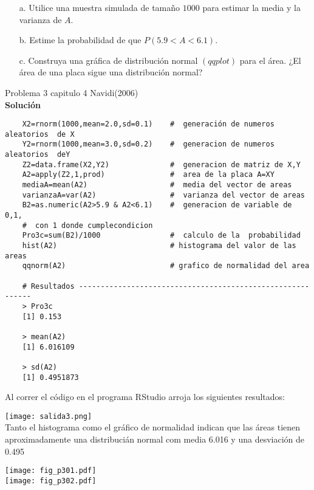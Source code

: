 \documentclass[base=hide,12pt]{elegantbook}
\begin{document}
\begin{itemize}
	\item[a.] Utilice una muestra simulada de tamaño $1000$ para estimar la media y la varianza de $A$.
	\item[b.] Estime la probabilidad de que $P(5.9 <A<6.1)$.
	\item[c.] Construya una gráfica de distribución normal $(qqplot)$ para el área. ¿El área de una placa sigue una distribución normal? 
\end{itemize}
Problema 3 capitulo 4 Navidi(2006) \\

\newpage 
\textcolor{col3}{\bf \large Solución}\\

\begin{lstlisting}
	X2=rnorm(1000,mean=2.0,sd=0.1)    #  generación de numeros aleatorios  de X
	Y2=rnorm(1000,mean=3.0,sd=0.2)    #  generacion de numeros aleatorios  deY
	Z2=data.frame(X2,Y2)              #  generacion de matriz de X,Y
	A2=apply(Z2,1,prod)               #  area de la placa A=XY
	mediaA=mean(A2)                   #  media del vector de areas 
	varianzaA=var(A2)                 #  varianza del vector de areas 
	B2=as.numeric(A2>5.9 & A2<6.1)    #  generacion de variable de 0,1, 
	#  con 1 donde cumplecondicion   
	Pro3c=sum(B2)/1000                #  calculo de la  probabilidad 
	hist(A2)                          # histograma del valor de las areas
	qqnorm(A2)                        # grafico de normalidad del area
	
	# Resultados -----------------------------------------------------------
	> Pro3c
	[1] 0.153
	
	> mean(A2)
	[1] 6.016109
	
	> sd(A2)
	[1] 0.4951873
\end{lstlisting}

Al correr el código en el programa   RStudio arroja los siguientes  resultados:

\texttt{[image: salida3.png]}\\

Tanto el histograma como el gráfico de normalidad indican que las áreas tienen aproximadamente una distribucián normal com media 6.016 y una desviación de 0.495

\texttt{[image: fig\_p301.pdf]}\\

\texttt{[image: fig\_p302.pdf]}\\




\end{document}
